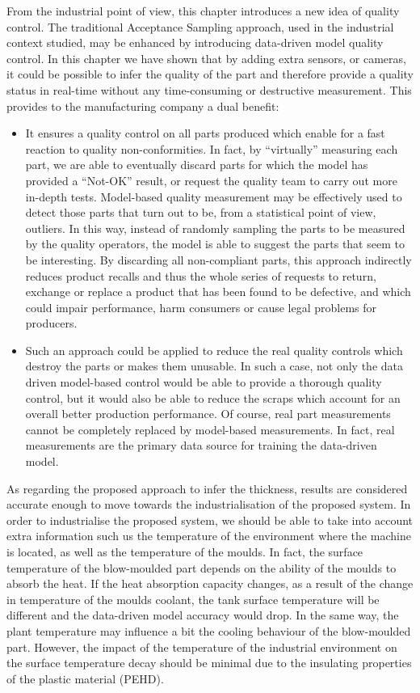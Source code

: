 From the industrial point of view, this chapter introduces a new idea of quality control. The traditional Acceptance Sampling approach, used in the industrial context studied, may be enhanced by introducing data-driven model quality control. In this chapter we have shown that by adding extra sensors, or cameras, it could be possible to infer the quality of the part and therefore provide a quality status in real-time without any time-consuming or destructive measurement. This provides to the manufacturing company a dual benefit:
%
\begin{itemize}
    \item It ensures a quality control on all parts produced which enable for a fast reaction to quality non-conformities. In fact, by ``virtually'' measuring each part, we are able to eventually discard parts for which the model has provided a ``Not-OK'' result, or request the quality team to carry out more in-depth tests. Model-based quality measurement may be effectively used to detect those parts that turn out to be, from a statistical point of view, outliers. In this way, instead of randomly sampling the parts to be measured by the quality operators, the model is able to suggest the parts that seem to be interesting. By discarding all non-compliant parts, this approach indirectly reduces product recalls and thus the whole series of requests to return, exchange or replace a product that has been found to be defective, and which could impair performance, harm consumers or cause legal problems for producers.
    \item Such an approach could be applied to reduce the real quality controls which destroy the parts or makes them unusable. In such a case, not only the data driven model-based control would be able to provide a thorough quality control, but it would also be able to reduce the scraps which account for an overall better production performance. Of course, real part measurements cannot be completely replaced by model-based measurements. In fact, real measurements are the primary data source for training the data-driven model. 
\end{itemize}
%
As regarding the proposed approach to infer the thickness, results are considered accurate enough to move towards the industrialisation of the proposed system. In order to industrialise the proposed system, we should be able to take into account extra information such us the temperature of the environment where the machine is located, as well as the temperature of the moulds. In fact, the surface temperature of the blow-moulded part depends on the ability of the moulds to absorb the heat. If the heat absorption capacity changes, as a result of the change in temperature of the moulds coolant, the tank surface temperature will be different and the data-driven model accuracy would drop. In the same way, the plant temperature may influence a bit the cooling behaviour of the blow-moulded part. However, the impact of the temperature of the industrial environment on the surface temperature decay should be minimal due to the insulating properties of the plastic material (PEHD).  



